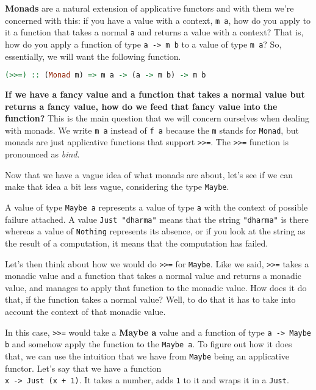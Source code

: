 \textbf{Monads} are a natural extension of applicative functors and with them we're concerned with this: if you have a value with a context, \texttt{m a}, how do you apply to it a function that takes a normal \texttt{a} and returns a value with a context? That is, how do you apply a function of type \texttt{a -> m b} to a value of type \texttt{m a}? So, essentially, we will want the following function.

\begin{lstlisting}[language=haskell]
(>>=) :: (Monad m) => m a -> (a -> m b) -> m b
\end{lstlisting}

\textbf{If we have a fancy value and a function that takes a normal value but returns a fancy value, how do we feed that fancy value into the function?} This is the main question that we will concern ourselves when dealing with monads. We write \texttt{m a} instead of \texttt{f a} because the \texttt{m} stands for \texttt{Monad}, but monads are just applicative functions that support \texttt{>>=}. The \texttt{>>=} function is pronounced as \textit{bind}.
\linebreak \linebreak

Now that we have a vague idea of what monads are about, let's see if we can make that idea a bit less vague, considering the type \texttt{Maybe}.
\linebreak \linebreak

A value of type \texttt{Maybe a} represents a value of type \texttt{a} with the context of possible failure attached. A value \texttt{Just "dharma"} means that the string \texttt{"dharma"} is there whereas a value of \texttt{Nothing} represents its absence, or if you look at the string as the result of a computation, it means that the computation has failed. 
\linebreak \linebreak

Let's then think about how we would do \texttt{>>=} for \texttt{Maybe}. Like we said, \texttt{>>=} takes a monadic value and a function that takes a normal value and returns a monadic value, and manages to apply that function to the monadic value. How does it do that, if the function takes a normal value? Well, to do that it has to take into account the context of that monadic value. 
\linebreak \linebreak

In this case, \texttt{>>=} would take a \textbf{Maybe a} value and a function of type \texttt{a -> Maybe b} and somehow apply the function to the \texttt{Maybe a}. To figure out how it does that, we can use the intuition that we have from \texttt{Maybe} being an applicative functor. Let's say that we have a function \texttt{\\x -> Just (x + 1)}. It takes a number, adds \texttt{1} to it and wraps it in a \texttt{Just}.

